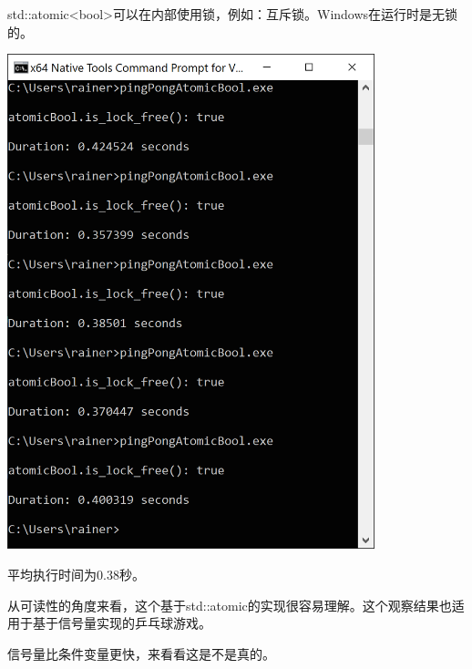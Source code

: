 std::atomic<bool>可以在内部使用锁，例如：互斥锁。Windows在运行时是无锁的。

\begin{center}
\includegraphics[width=0.8\textwidth]{content/3/chapter7/images/5.png}\\
\end{center}

平均执行时间为0.38秒。

从可读性的角度来看，这个基于std::atomic的实现很容易理解。这个观察结果也适用于基于信号量实现的乒乓球游戏。


信号量比条件变量更快，来看看这是不是真的。

